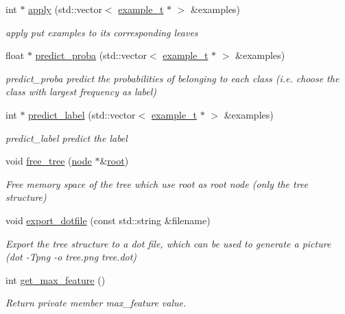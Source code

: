 \begin{DoxyCompactItemize}
int $\ast$ \hyperlink{classtree_ade03b3a32ba92c5c555cd68915643db9}{apply} (std\+::vector$<$ \hyperlink{classexample__t}{example\+\_\+t} $\ast$ $>$ \&examples)
\begin{DoxyCompactList}\small\item\em apply put examples to its corresponding leaves \end{DoxyCompactList}\item 
float $\ast$ \hyperlink{classtree_a858e62ccbc0c8bc1dc837d1812e819a4}{predict\+\_\+proba} (std\+::vector$<$ \hyperlink{classexample__t}{example\+\_\+t} $\ast$ $>$ \&examples)
\begin{DoxyCompactList}\small\item\em predict\+\_\+proba predict the probabilities of belonging to each class (i.\+e. choose the class with largest frequency as label) \end{DoxyCompactList}\item 
int $\ast$ \hyperlink{classtree_ade91b0a69182001feab61419e5f3d8d1}{predict\+\_\+label} (std\+::vector$<$ \hyperlink{classexample__t}{example\+\_\+t} $\ast$ $>$ \&examples)
\begin{DoxyCompactList}\small\item\em predict\+\_\+label predict the label \end{DoxyCompactList}\item 
void \hyperlink{classtree_ae92bd57b719a2575d9fec46f514cbbe9}{free\+\_\+tree} (\hyperlink{classnode}{node} $\ast$\&\hyperlink{classtree_ad397d4906e47149b98f769b3e81473ee}{root})
\begin{DoxyCompactList}\small\item\em Free memory space of the tree which use {\ttfamily root} as root node (only the tree structure) \end{DoxyCompactList}\item 
void \hyperlink{classtree_abc6048c70de7490eabf2433d46067b7b}{export\+\_\+dotfile} (const std\+::string \&filename)
\begin{DoxyCompactList}\small\item\em Export the tree structure to a dot file, which can be used to generate a picture (dot -\/\+Tpng -\/o tree.\+png tree.\+dot) \end{DoxyCompactList}\item 
int \hyperlink{classtree_a8042d0897915fdfeeca4b4d75515b96c}{get\+\_\+max\+\_\+feature} ()
\begin{DoxyCompactList}\small\item\em Return private member {\ttfamily max\+\_\+feature} value. \end{DoxyCompactList}\item 

\end{DoxyCompactItemize}
